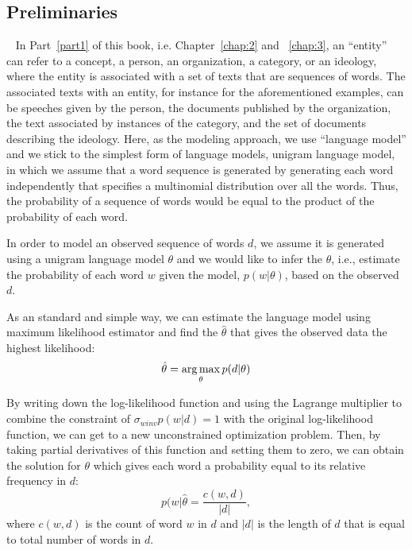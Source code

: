 \subsection{Preliminaries}
~\label{chap2_preliminaries}
In Part~\ref{part1} of this book, i.e. Chapter~\ref{chap:2} and ~\ref{chap:3}, an ``entity'' can refer to a concept, a person, an organization, a category, or an ideology, where the entity is associated with a set of texts that are sequences of words. The associated texts with an entity, for instance for the aforementioned examples, can be speeches given by the person, the documents published by the organization, the text associated by instances of the category, and the set of documents describing the ideology.
%
%
Here, as the modeling approach, we use ``language model'' and we stick to the simplest form of language models, unigram language model, in which we assume that a word sequence is generated by generating each word independently that specifies a multinomial distribution over all the words. Thus, the probability of a sequence of words would be equal to the product of the probability of each word.  

In order to model an observed sequence of words $d$, we assume it is generated using a unigram language model $\theta$ and we would like to infer the $\theta$, i.e., estimate the probability of each word $w$ given the model, $p(w|\theta)$, based on the observed $d$. 

As an standard and simple way, we can estimate the language model using maximum likelihood estimator and find the $\hat{\theta}$ that gives the observed data the highest likelihood:
\begin{equation}
\hat{\theta} = \operatorname*{arg\,max}_\theta p(d|\theta)
\end{equation}

By writing down the log-likelihood function and using the Lagrange multiplier to combine the constraint of $\sigma_{w in v}p(w|d) =1$ with the original log-likelihood function, we can get to a new unconstrained optimization problem. Then, by taking partial derivatives of this function and setting them to zero, we can obtain the solution for $\theta$ which gives each word a probability equal to its relative frequency in $d$:
\begin{equation}
    p(w|\hat{\theta} = \frac{c(w, d)}{|d|},
\end{equation}
where $c(w, d)$ is the count of word $w$ in $d$ and $|d|$ is the length of $d$ that is equal to total number of words in $d$.


